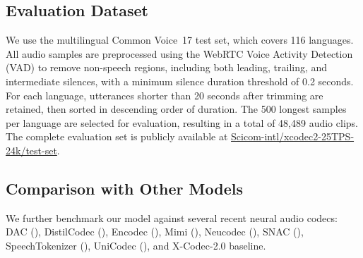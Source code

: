\documentclass[preprint]{article}
\begin{document}
\subsection{Evaluation Dataset}
We use the multilingual Common Voice~17 test set, which covers 116 languages. 
All audio samples are preprocessed using the WebRTC Voice Activity Detection (VAD) to remove non-speech regions, including both leading, trailing, and intermediate silences, with a minimum silence duration threshold of 0.2 seconds. 
For each language, utterances shorter than 20 seconds after trimming are retained, then sorted in descending order of duration. 
The 500 longest samples per language are selected for evaluation, resulting in a total of 48{,}489 audio clips. 
The complete evaluation set is publicly available at \href{https://huggingface.co/Scicom-intl/xcodec2-25TPS-24k/tree/main/test-set}{Scicom-intl/xcodec2-25TPS-24k/test-set}.

\subsection{Comparison with Other Models}
We further benchmark our model against several recent neural audio codecs: DAC (\citet{kumar2023highfidelityaudiocompressionimproved}), DistilCodec (\citet{wang2025unittsendtoendttsdecoupling}), Encodec (\citet{défossez2022highfidelityneuralaudio}), Mimi (\citet{défossez2024moshispeechtextfoundationmodel}), Neucodec (\citet{julian2025finitescalarquantizationenables}), SNAC (\citet{siuzdak2024snac}), SpeechTokenizer (\citet{zhang2024speechtokenizerunifiedspeechtokenizer}), UniCodec (\citet{jiang2025unicodecunifiedaudiocodec}), and X-Codec-2.0 baseline.

\pagebreak
\end{document}
